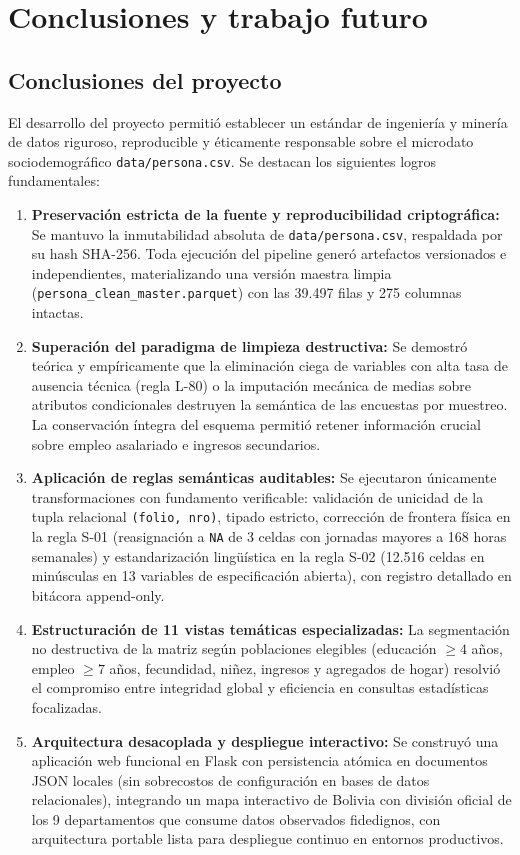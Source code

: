 \section{Conclusiones y trabajo futuro}

\subsection{Conclusiones del proyecto}
El desarrollo del proyecto permitió establecer un estándar de ingeniería y minería de datos riguroso, reproducible y éticamente responsable sobre el microdato sociodemográfico \texttt{data/persona.csv}. Se destacan los siguientes logros fundamentales:

\begin{enumerate}[leftmargin=0.5in]
  \item \textbf{Preservación estricta de la fuente y reproducibilidad criptográfica:} Se mantuvo la inmutabilidad absoluta de \texttt{data/persona.csv}, respaldada por su hash SHA-256. Toda ejecución del pipeline generó artefactos versionados e independientes, materializando una versión maestra limpia (\texttt{persona\_clean\_master.parquet}) con las 39.497 filas y 275 columnas intactas.
  \item \textbf{Superación del paradigma de limpieza destructiva:} Se demostró teórica y empíricamente que la eliminación ciega de variables con alta tasa de ausencia técnica (regla L-80) o la imputación mecánica de medias sobre atributos condicionales destruyen la semántica de las encuestas por muestreo. La conservación íntegra del esquema permitió retener información crucial sobre empleo asalariado e ingresos secundarios.
  \item \textbf{Aplicación de reglas semánticas auditables:} Se ejecutaron únicamente transformaciones con fundamento verificable: validación de unicidad de la tupla relacional \texttt{(folio, nro)}, tipado estricto, corrección de frontera física en la regla S-01 (reasignación a \texttt{NA} de 3 celdas con jornadas mayores a 168 horas semanales) y estandarización lingüística en la regla S-02 (12.516 celdas en minúsculas en 13 variables de especificación abierta), con registro detallado en bitácora append-only.
  \item \textbf{Estructuración de 11 vistas temáticas especializadas:} La segmentación no destructiva de la matriz según poblaciones elegibles (educación $\ge 4$ años, empleo $\ge 7$ años, fecundidad, niñez, ingresos y agregados de hogar) resolvió el compromiso entre integridad global y eficiencia en consultas estadísticas focalizadas.
  \item \textbf{Arquitectura desacoplada y despliegue interactivo:} Se construyó una aplicación web funcional en Flask con persistencia atómica en documentos JSON locales (sin sobrecostos de configuración en bases de datos relacionales), integrando un mapa interactivo de Bolivia con división oficial de los 9 departamentos que consume datos observados fidedignos, con arquitectura portable lista para despliegue continuo en entornos productivos.
\end{enumerate}

